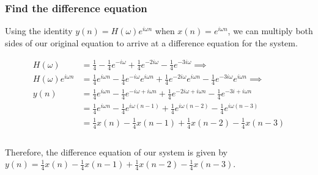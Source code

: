 \documentclass{article}
\newenvironment{directsubsubs}{
  \makeatletter
  \renewcommand\thesubsubsection{\thesection.\Roman{subsubsection}}
  \makeatother
}{
  \makeatletter
  \renewcommand\thesubsubsection{\thesubsection.\Roman{subsubsection}}
  \makeatother
}
\renewcommand{\thesubsection}{\thesection.\alph{subsection}}
\renewcommand{\thesubsubsection}{\thesection.\alph{subsection}.\Roman{subsubsection}}
\begin{document}
\begin{directsubsubs}
\subsubsection[~\thesubsubsection]{Find the difference equation}

Using the identity $y(n) = H(\omega)e^{i{\omega}n}$ when $x(n) = e^{i{\omega}n}$, we can multiply both sides of our original equation to arrive at a difference equation for the system.

\begin{align*}
	H(\omega) &= \frac{1}{4} - \frac{1}{4}e^{-i{\omega}} + \frac{1}{4}e^{-2i{\omega}} - \frac{1}{4}e^{-3i{\omega}} \implies \\
	H(\omega)e^{i{\omega}n} &= \frac{1}{4}e^{i{\omega}n} - \frac{1}{4}e^{-i{\omega}}e^{i{\omega}n} + \frac{1}{4}e^{-2i{\omega}}e^{i{\omega}n} - \frac{1}{4}e^{-3i{\omega}}e^{i{\omega}n} \implies \\
	y(n) &= \frac{1}{4}e^{i{\omega}n} - \frac{1}{4}e^{-i{\omega} + i{\omega}n} + \frac{1}{4}e^{-2i{\omega} + i{\omega}n} - \frac{1}{4}e^{-3i + i{\omega}n} \\
	&= \frac{1}{4}e^{i{\omega}n} - \frac{1}{4}e^{i{\omega}(n - 1)} + \frac{1}{4}e^{i{\omega}(n - 2)} - \frac{1}{4}e^{i{\omega}(n - 3)} \\
	&= \frac{1}{4}x(n) - \frac{1}{4}x(n - 1) + \frac{1}{4}x(n - 2) - \frac{1}{4}x(n - 3) \\\\
\end{align*}

Therefore, the difference equation of our system is given by $y(n) = \frac{1}{4}x(n) - \frac{1}{4}x(n - 1) + \frac{1}{4}x(n - 2) - \frac{1}{4}x(n - 3)$.






\end{directsubsubs}
\end{document}
